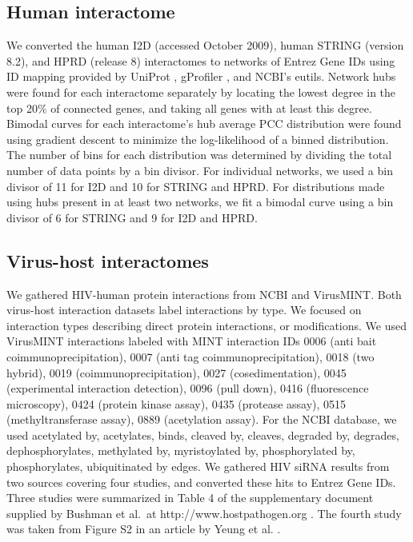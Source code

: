   \subsection{Human interactome}
    We converted the human I2D (accessed October 2009), human STRING
    (version 8.2), and HPRD (release 8) interactomes to networks of
    Entrez Gene IDs using ID mapping provided by UniProt
    \cite{citeulike:6008733}, gProfiler \cite{reimand2007g}, and
    NCBI's eutils. Network hubs were found for each interactome
    separately by locating the lowest degree in the top 20\% of
    connected genes, and taking all genes with at least this
    degree. Bimodal curves for each interactome's hub average PCC
    distribution were found using gradient descent to minimize the
    log-likelihood of a binned distribution. The number of bins for
    each distribution was determined by dividing the total number of
    data points by a bin divisor. For individual networks, we used a
    bin divisor of 11 for I2D and 10 for STRING and HPRD. For
    distributions made using hubs present in at least two networks, we
    fit a bimodal curve using a bin divisor of 6 for STRING and 9 for
    I2D and HPRD.

  \subsection{Virus-host interactomes}
    We gathered HIV-human protein interactions from NCBI and
    VirusMINT. Both virus-host interaction datasets label interactions
    by type. We focused on interaction types describing direct protein
    interactions, or modifications. We used VirusMINT interactions
    labeled with MINT interaction IDs 0006 (anti bait
    coimmunoprecipitation), 0007 (anti tag coimmunoprecipitation),
    0018 (two hybrid), 0019 (coimmunoprecipitation), 0027
    (cosedimentation), 0045 (experimental interaction detection), 0096
    (pull down), 0416 (fluorescence microscopy), 0424 (protein kinase
    assay), 0435 (protease assay), 0515 (methyltransferase assay),
    0889 (acetylation assay). For the NCBI database, we used
    acetylated by, acetylates, binds, cleaved by, cleaves, degraded
    by, degrades, dephosphorylates, methylated by, myristoylated by,
    phosphorylated by, phosphorylates, ubiquitinated by edges. We
    gathered HIV siRNA results from two sources covering four studies,
    and converted these hits to Entrez Gene IDs. Three studies were
    summarized in Table 4 of the supplementary document supplied by
    Bushman et al.\ at http://www.hostpathogen.org
    \cite{bushman09}. The fourth study was taken from Figure S2 in an
    article by Yeung et al. \cite{yeung09}.

